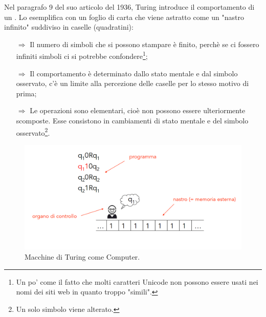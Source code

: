 Nel paragrafo 9 del suo articolo del 1936, Turing introduce
il comportamento di un . Lo esemplifica con un
foglio di carta che viene astratto come un "nastro infinito" suddiviso in
caselle (quadratini):
\begin{itemize}
    \item [$\Rightarrow$] Il numero di simboli che si possono stampare è finito,
    perchè se ci fossero infiniti simboli ci si potrebbe confondere\footnote{Un po'
    come il fatto che molti caratteri Unicode non possono essere usati nei
    nomi dei siti web in quanto troppo "simili".};
    \item [$\Rightarrow$] Il comportamento è determinato dallo stato mentale
    e dal simbolo osservato, c'è un limite alla percezione delle caselle per lo stesso
    motivo di prima;
    \item [$\Rightarrow$] Le operazioni sono elementari, cioè non possono essere
    ulteriormente scomposte. Esse consistono in cambiamenti di stato mentale e  
    del simbolo osservato\footnote{Un solo simbolo viene alterato.}.
\end{itemize}

\begin{figure}[h]
    \centering
    \includegraphics[scale = 0.35]{images/Turing.png}
    \caption{Macchine di Turing come Computer.}
\end{figure}



